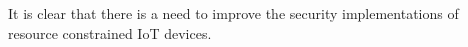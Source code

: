 It is clear that there is a need to improve the security implementations of
resource constrained IoT devices.
